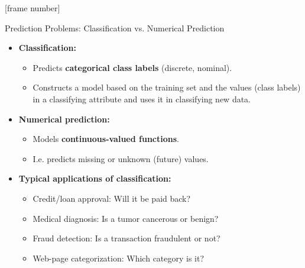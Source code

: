 \documentclass[aspectratio=169,t,table]{beamer}
\begin{document}
  {
    [frame number]
    \begin{frame}{Prediction Problems: Classification vs. Numerical Prediction}
        \begin{itemize}
            \item \textbf{Classification:}
            \begin{itemize}
              \item Predicts \textbf{\color{airforceblue}categorical class labels} (discrete, nominal).
              \item Constructs a model based on the training set and the values (class labels) in a classifying attribute and uses it in classifying new data.
            \end{itemize}
            \item \textbf{Numerical prediction:}
            \begin{itemize}
              \item Models \textbf{\color{airforceblue}continuous-valued functions}.
              \item I.e. predicts missing or unknown (future) values.
            \end{itemize}
            \item \textbf{Typical applications of classification:}
            \begin{itemize}
              \item Credit/loan approval: Will it be paid back?
              \item Medical diagnosis: Is a tumor cancerous or benign?
              \item Fraud detection: Is a transaction fraudulent or not?
              \item Web-page categorization: Which category is it?
            \end{itemize}
        \end{itemize}
    \end{frame}
  }
\end{document}
